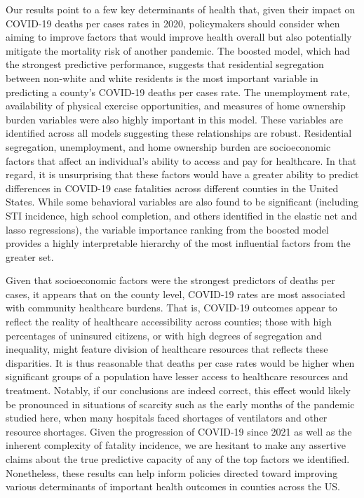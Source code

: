 \documentclass[
]{article}
\begin{document}
Our results point to a few key determinants of health that, given their impact on COVID-19 deaths per cases rates in 2020, policymakers should consider when aiming to improve factors that would improve health overall but also potentially mitigate the mortality risk of another pandemic. The boosted model, which had the strongest predictive performance, suggests that residential segregation between non-white and white residents is the most important variable in predicting a county's COVID-19 deaths per cases rate. The unemployment rate, availability of physical exercise opportunities, and measures of home ownership burden variables were also highly important in this model. These variables are identified across all models suggesting these relationships are robust. Residential segregation, unemployment, and home ownership burden are socioeconomic factors that affect an individual's ability to access and pay for healthcare. In that regard, it is unsurprising that these factors would have a greater ability to predict differences in COVID-19 case fatalities across different counties in the United States. While some behavioral variables are also found to be significant (including STI incidence, high school completion, and others identified in the elastic net and lasso regressions), the variable importance ranking from the boosted model provides a highly interpretable hierarchy of the most influential factors from the greater set.

Given that socioeconomic factors were the strongest predictors of deaths per cases, it appears that on the county level, COVID-19 rates are most associated with community healthcare burdens. That is, COVID-19 outcomes appear to reflect the reality of healthcare accessibility across counties; those with high percentages of uninsured citizens, or with high degrees of segregation and inequality, might feature division of healthcare resources that reflects these disparities. It is thus reasonable that deaths per case rates would be higher when significant groups of a population have lesser access to healthcare resources and treatment. Notably, if our conclusions are indeed correct, this effect would likely be pronounced in situations of scarcity such as the early months of the pandemic studied here, when many hospitals faced shortages of ventilators and other resource shortages. Given the progression of COVID-19 since 2021 as well as the inherent complexity of fatality incidence, we are hesitant to make any assertive claims about the true predictive capacity of any of the top factors we identified. Nonetheless, these results can help inform policies directed toward improving various determinants of important health outcomes in counties across the US.
\end{document}
